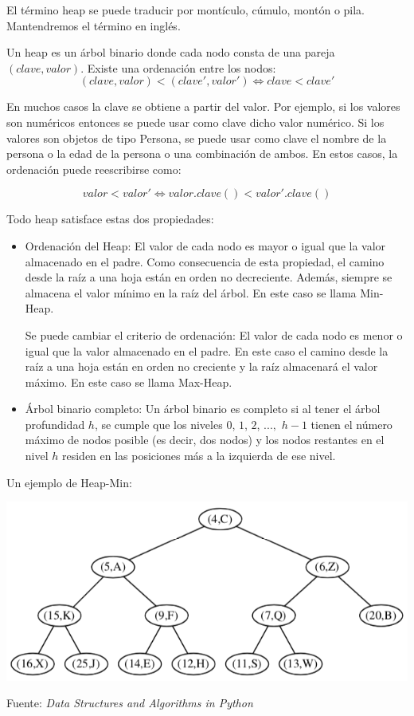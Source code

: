 El término heap se puede traducir por montículo, cúmulo, montón o pila. Mantendremos el término en inglés.

Un heap es un árbol binario donde cada nodo consta de una pareja $(clave, valor)$. Existe una ordenación entre los nodos:
 $$(clave, valor) <  (clave', valor') \Leftrightarrow  clave < clave'$$

En muchos casos la clave se obtiene a partir del valor. Por ejemplo, si los valores son numéricos entonces se puede usar como clave dicho valor numérico. Si los valores son objetos de tipo Persona, se puede usar como clave el nombre de la persona o la edad de la persona o una combinación de ambos. En estos casos, la ordenación puede reescribirse como:

 $$valor <  valor' \Leftrightarrow  valor.clave() < valor'.clave()$$
 


Todo heap satisface estas dos propiedades:
\begin{itemize}
\item Ordenación del Heap: El valor de cada nodo es mayor o igual que la valor almacenado en el padre. Como consecuencia de esta propiedad, el  camino desde la raíz a una hoja están en orden no decreciente. Además, siempre se almacena el valor mínimo en la raíz del árbol. En este caso se llama Min-Heap.

Se puede cambiar el criterio de ordenación: El valor de cada nodo es menor o igual que la valor almacenado en el padre. En este caso el  camino desde la raíz a una hoja están en orden no creciente y la raíz almacenará el valor máximo. En este caso se llama Max-Heap.


\item Árbol binario completo: Un árbol binario es completo si al tener el árbol profundidad $h$, se cumple que los niveles $0$, $1$, $2$, $...,$ $h-1$ tienen el número máximo de nodos posible (es decir, dos nodos) y los nodos restantes en el nivel $h$ residen en las posiciones más a la izquierda de ese nivel.
\end{itemize}

\begin{ejemplo}
Un ejemplo de Heap-Min:

\centerline{\includegraphics[width=.6\textwidth]{input/06-Graph-fig/ejemploDeHeap}}

Fuente: \textit{Data Structures and Algorithms in Python}
\end{ejemplo}


